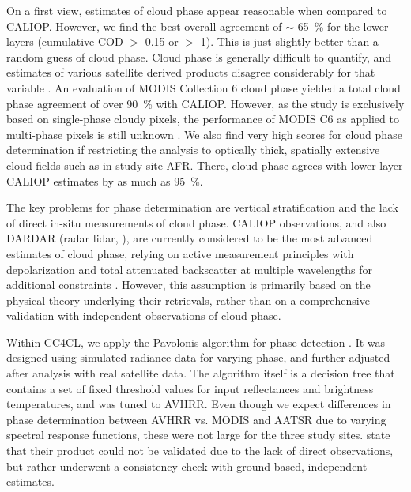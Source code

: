 On a first view, estimates of cloud phase appear reasonable when compared to CALIOP. However, we find the best overall agreement of $\sim$ 65~\% for the lower layers (cumulative COD $>$ 0.15 or $>$ 1). This is just slightly better than a random guess of cloud phase. Cloud phase is generally difficult to quantify, and estimates of various satellite derived products disagree considerably for that variable \citep{Stengel15}. An evaluation of MODIS Collection 6 cloud phase yielded a total cloud phase agreement of over 90~\% with CALIOP. However, as the study is exclusively based on single-phase cloudy pixels, the performance of MODIS C6 as applied to multi-phase pixels is still unknown \citep{Marchant16}. We also find very high scores for cloud phase determination if restricting the analysis to optically thick, spatially extensive cloud fields such as in study site AFR. There, cloud phase agrees with lower layer CALIOP estimates by as much as 95~\%. 

The key problems for phase determination are vertical stratification and the lack of direct in-situ measurements of cloud phase. CALIOP observations, and also DARDAR (radar lidar, \citet{Ceccaldi13}), are currently considered to be the most advanced estimates of cloud phase, relying on active measurement principles with depolarization and total attenuated backscatter at multiple wavelengths for additional constraints \citep{Winker09,Karlsson10}. However, this assumption is primarily based on the physical theory underlying their retrievals, rather than on a comprehensive validation with independent observations of cloud phase. 

Within CC4CL, we apply the Pavolonis algorithm for phase detection \citep{Pavolonis05}. It was designed using simulated radiance data for varying phase, and further adjusted after analysis with real satellite data. The algorithm itself is a decision tree that contains a set of fixed threshold values for input reflectances and brightness temperatures, and was tuned to AVHRR. Even though we expect differences in phase determination between AVHRR vs. MODIS and AATSR due to varying spectral response functions, these were not large for the three study sites. \citet{Pavolonis05} state that their product could not be validated due to the lack of direct observations, but rather underwent a consistency check with ground-based, independent estimates. 


